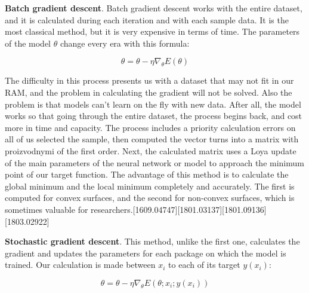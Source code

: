 \vspace{-0.3cm}

\noindent \textbf{Batch gradient descent}. Batch gradient descent works with the entire dataset, and it is calculated during each iteration and with each sample data. It is the most classical method, but it is very expensive in terms of time. The parameters of the model $\theta$ change every era with this formula:


\begin{equation}
	\theta = \theta - \eta\nabla_{\theta}E(\theta)
\end{equation}

\noindent The difficulty in this process presents us with a dataset that may not fit in our RAM, and the problem in calculating the gradient will not be solved. Also the problem is that models can't learn on the fly with new data. After all, the model works so that going through the entire dataset, the process begins back, and cost more in time and capacity. The process includes a priority calculation errors on all of us selected the sample, then computed the vector turns into a matrix with proizvodnymi of the first order. Next, the calculated matrix uses a Loya update of the main parameters of the neural network or model to approach the minimum point of our target function. The advantage of this method is to calculate the global minimum and the local minimum completely and accurately. The first is computed for convex surfaces, and the second for non-convex surfaces, which is sometimes valuable for researchers.[1609.04747][1801.03137][1801.09136][1803.02922]

\noindent \textbf{Stochastic gradient descent}. This method, unlike the first one, calculates the gradient and updates the parameters for each package on which the model is trained. Our calculation is made between $x_i$ to each of its target $y(x_i)$:

\begin{equation}
	\theta = \theta- {\eta}{\nabla_\theta}E(\theta;x_i;y(x_i))
\end{equation}


